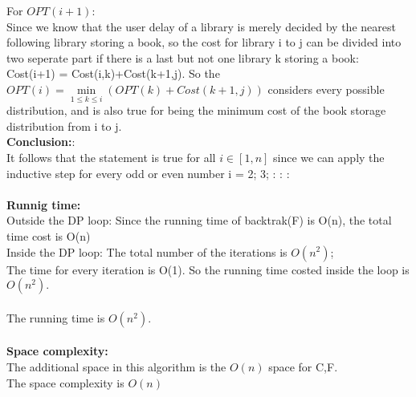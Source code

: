 \documentclass{article}
\begin{document}
For $OPT(i+1):$\\
Since we know that the user delay of a library is merely decided by the nearest following library storing a book, so the cost for library i to j can be divided into two seperate part if there is a last but not one library k storing a book: Cost(i+1) = Cost(i,k)+Cost(k+1,j). So the $OPT(i) = \min\limits_{1\le k \le i}(OPT(k)+Cost(k+1,j))$ considers every possible distribution, and is also true for being the minimum cost of the book storage distribution from i to j.\\
\textbf{Conclusion:}:\\
It follows that the statement is true for all $i \in [1,n]$ since we can apply the inductive step for every odd or even number i = 2; 3; : : :\\\\
\textbf{\large Runnig time:\\}
Outside the DP loop: Since the running time of backtrak(F) is O(n), the total time cost is O(n)\\
Inside the DP loop: The total number of the iterations is  $O(n^2)$;\\
The time for every iteration is O(1). So the running time costed inside the loop is $O(n^2).$\\\\
The running time is $O(n^2).$\\\\
\textbf{\large Space complexity:\\}
The additional space in this algorithm is the $O(n)$ space for C,F.\\
The space complexity is $O(n)$



\clearpage
\end{document}
